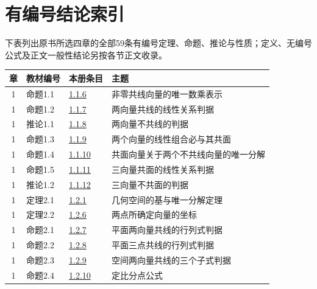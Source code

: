 \documentclass[11pt,a4paper]{article}
\begin{document}
\section*{有编号结论索引}


下表列出原书所选四章的全部59条有编号定理、命题、推论与性质；定义、无编号公式及正文一般性结论另按各节正文收录。

\begin{longtable}{@{}cllp{65mm}@{}}\toprule 章&教材编号&本册条目&主题\\\midrule\endhead

1&命题1.1&\hyperref[entry:1.1.6]{1.1.6}&非零共线向量的唯一数乘表示\\

1&命题1.2&\hyperref[entry:1.1.7]{1.1.7}&两向量共线的线性关系判据\\

1&推论1.1&\hyperref[entry:1.1.8]{1.1.8}&两向量不共线的判据\\

1&命题1.3&\hyperref[entry:1.1.9]{1.1.9}&两个向量的线性组合必与其共面\\

1&命题1.4&\hyperref[entry:1.1.10]{1.1.10}&共面向量关于两个不共线向量的唯一分解\\

1&命题1.5&\hyperref[entry:1.1.11]{1.1.11}&三向量共面的线性关系判据\\

1&推论1.2&\hyperref[entry:1.1.12]{1.1.12}&三向量不共面的判据\\

1&定理2.1&\hyperref[entry:1.2.1]{1.2.1}&几何空间的基与唯一分解定理\\

1&定理2.2&\hyperref[entry:1.2.6]{1.2.6}&两点所确定向量的坐标\\

1&命题2.1&\hyperref[entry:1.2.7]{1.2.7}&平面两向量共线的行列式判据\\

1&命题2.2&\hyperref[entry:1.2.8]{1.2.8}&平面三点共线的行列式判据\\

1&命题2.3&\hyperref[entry:1.2.9]{1.2.9}&空间两向量共线的三个子式判据\\

1&命题2.4&\hyperref[entry:1.2.10]{1.2.10}&定比分点公式\\


\end{longtable}
\end{document}
